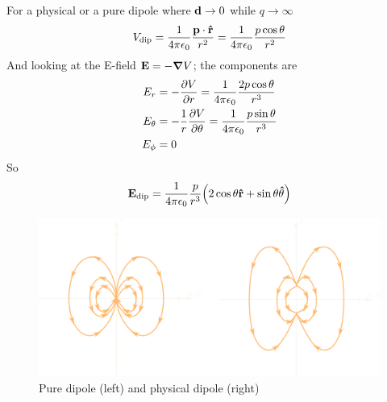 \documentclass[../main.tex]{subfiles}
\begin{document}
For a physical or a pure dipole where $\vb d \to 0$ while $q \to \infty$
\begin{align*}
    V_\text{dip} = \frac{1}{4\pi\epsilon_0} \frac{\vb p \cdot \vu r}{r^2} = \frac{1}{4\pi\epsilon_0} \frac{p \cos\theta}{r^2}
\end{align*}
And looking at the E-field $\vb E = -\grad V$; the components are
\begin{align*}
    E_r &= -\pdv{V}{r} = \frac{1}{4\pi\epsilon_0} \frac{2p\cos\theta}{r^3} \\
    E_\theta &= -\frac{1}{r} \pdv{V}{\theta} = \frac{1}{4\pi\epsilon_0} \frac{p\sin\theta}{r^3} \\
    E_\phi &= 0
\end{align*}
So
\begin{align*}
    \vb E_\text{dip} = \ke \frac{p}{r^3} \qt(2\cos\theta \vu r + \sin\theta \vu \theta)
\end{align*}
\begin{figure}[ht]
    \centering
    \includegraphics[width=0.5\linewidth]{fig3_29b.png}
    \caption{Pure dipole (left) and physical dipole (right)}
    \label{fig:lecture3_29b}
\end{figure}
\end{document}
